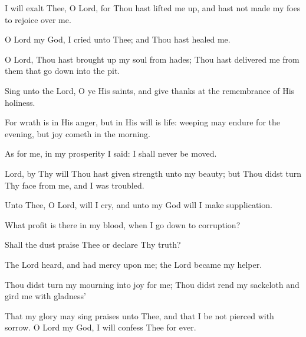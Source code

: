 I will exalt Thee, O Lord, for Thou hast lifted me up, and hast not made my foes to rejoice over me.

O Lord my God, I cried unto Thee; and Thou hast healed me.

O Lord, Thou hast brought up my soul from hades; Thou hast delivered me from them that go down into the pit.

Sing unto the Lord, O ye His saints, and give thanks at the remembrance of His holiness.

For wrath is in His anger, but in His will is life: weeping may endure for the evening, but joy cometh in the morning.

As for me, in my prosperity I said: I shall never be moved.

Lord, by Thy will Thou hast given strength unto my beauty; but Thou didst turn Thy face from me, and I was troubled.

Unto Thee, O Lord, will I cry, and unto my God will I make supplication.

What profit is there in my blood, when I go down to corruption?

Shall the dust praise Thee or declare Thy truth?

The Lord heard, and had mercy upon me; the Lord became my helper.

Thou didst turn my mourning into joy for me; Thou didst rend my sackcloth and gird me with gladness'

That my glory may sing praises unto Thee, and that I be not pierced with sorrow. O Lord my God, I will confess Thee for ever.
